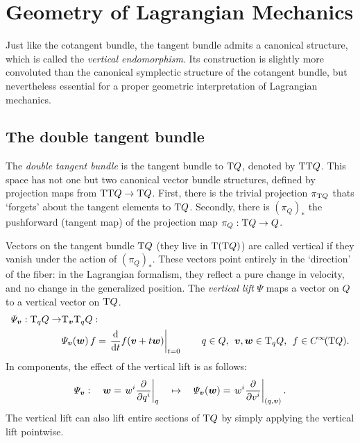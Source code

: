 \chapter{Geometry of Lagrangian Mechanics}
\label{app:symplectic_geometry}

Just like the cotangent bundle, the tangent bundle admits a canonical structure, which is called the \emph{vertical endomorphism}. Its construction is slightly more convoluted than the canonical symplectic structure of the cotangent bundle, but nevertheless essential for a proper geometric interpretation of Lagrangian mechanics. 

\section{The double tangent bundle} The \emph{double tangent bundle} is the tangent bundle to \(\mathrm{T}Q\), denoted by \(\mathrm{T}\mathrm{T}Q\). This space has not one but two canonical vector bundle structures, defined by projection maps from \(\mathrm{T}\mathrm{T}Q \to \mathrm{T}Q\). First, there is the trivial projection \(\pi_{\mathrm{T}Q}\) thats `forgets' about the tangent elements to \(\mathrm{T}Q\). Secondly, there is \( (\pi_{Q})_* \) the pushforward (tangent map) of the projection map \(\pi_Q: \mathrm{T}Q \to Q\). \cite{Abraham1978}
\begin{center}
\end{center}
Vectors on the tangent bundle \(\mathrm{T}Q\) (they live in \(\mathrm{T}(\mathrm{T}Q)\)) are called vertical if they vanish under the action of \( (\pi_Q)_* \). These vectors point entirely in the `direction' of the fiber: in the Lagrangian formalism, they reflect a pure change in velocity, and no change in the generalized position. The \emph{vertical lift} \(\Psi\) maps a vector on \(Q\) to a vertical vector on \(\mathrm{T}Q\). \cite{Carinena1990}
\begin{equation}
    \begin{split}
        \Psi_{\vec{v}}: \tspace{q}{Q} \to & \tspace{\vec{v}}{\tspace{q}{Q}}: \\ 
        & \Psi_{\vec{v}}(\vec{w})\,f = \left. \dv{}{t} f(\vec{v} + t\vec{w})\right |_{t = 0}
        \qquad q \in Q,\:\: \vec{v},\vec{w}\in \tspace{q}{Q},\:\: f \in \functions{\tbundle{Q}}.
    \end{split}
\end{equation}
In components, the effect of the vertical lift is as follows:
\begin{equation}
     \Psi_{\vec{v}}: \quad \vec{w} = \left. w^i \pdv{}{q^i}\right|_q \quad \mapsto \quad  \Psi_{\vec{v}}(\vec{w}) = \left.w^i \pdv{}{v^i}\right|_{(q, \vec{v})}.
\end{equation}
The vertical lift can also lift entire sections of \(\mathrm{T}Q\) by simply applying the vertical lift pointwise.

